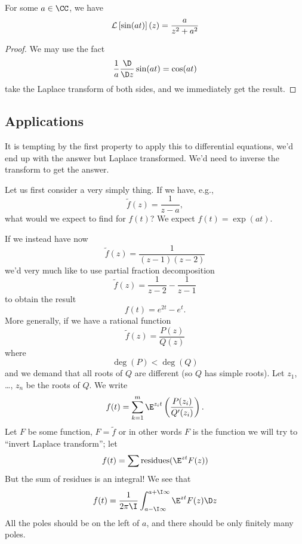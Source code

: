 \begin{prop}
For some $a\in\CC$, we have
\begin{equation}
\mathcal{L}\left[\sin(at)\right](z) = \frac{a}{z^{2}+a^{2}}
\end{equation}
\end{prop}
\begin{proof}
We may use the fact
\begin{equation}
\frac{1}{a}\frac{\D}{\D z}\sin(at)=\cos(at)
\end{equation}
take the Laplace transform of both sides, and we immediately get
the result.
\end{proof}

\subsection{Applications}
It is tempting by the first property to apply this to
differential equations, we'd end up with the answer but Laplace
transformed. We'd need to inverse the transform to get the
answer. 

Let us first consider a very simply thing. If we have, e.g., 
\begin{equation}
\widetilde{f}(z)=\frac{1}{z-a},
\end{equation}
what would we expect to find for $f(t)$? We expect $f(t)=\exp(at)$.

If we instead have now
\begin{equation}
\widetilde{f}(z)=\frac{1}{(z-1)(z-2)}
\end{equation}
we'd very much like to use partial fraction decomposition
\begin{equation}
\widetilde{f}(z)=\frac{1}{z-2}-\frac{1}{z-1}
\end{equation}
to obtain the result
\begin{equation}
f(t)=e^{2t}-e^{t}.
\end{equation}
More generally, if we have a rational function
\begin{equation}
\widetilde{f}(z)=\frac{P(z)}{Q(z)}
\end{equation}
where
\begin{equation}
\deg(P)<\deg(Q)
\end{equation}
and we demand that all roots of $Q$ are different (so $Q$ has
simple roots). Let $z_{1}$, \dots, $z_{n}$ be the roots of
$Q$. We write
\begin{equation}
f(t) = \sum^{m}_{k=1}\E^{z_{i}t}\left(\frac{P(z_{i})}{Q'(z_{i})}\right).
\end{equation}
Let $F$ be some function, $F=\widetilde{f}$ or in other words $F$
is the function we will try to ``invert Laplace transform''; let 
\begin{equation}
f(t)=\sum\mbox{residues}(\E^{zt}F(z))
\end{equation}
But the sum of residues is an integral! We see that
\begin{equation}
f(t)=\frac{1}{2\pi\I}\int^{a+\I\infty}_{a-\I\infty}\E^{zt}F(z)\D z
\end{equation}
All the poles should be on the left of $a$, and there should be
only finitely many poles.
